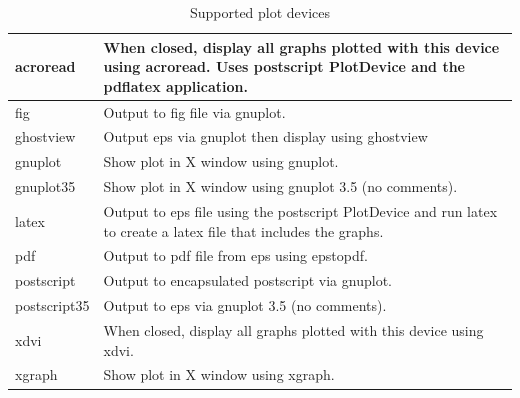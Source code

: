 \documentclass[11pt]{article}
\begin{document}
\begin{table}[ht]
\begin{center}
\begin{tabular}{|l|l|}\hline
  acroread     & \begin{minipage}[c]{4in}
                 \vspace{0.05in}
                 When closed, display all graphs plotted with this 
		 device using acroread.  Uses postscript PlotDevice and the 
                 pdflatex application.
                 \vspace{0.05in}
                 \end{minipage} \\\hline
  fig          & Output to fig file via gnuplot.  \\\hline
  ghostview    & Output eps via gnuplot then display using ghostview \\ \hline
  gnuplot      & Show plot in X window using gnuplot.    \\ \hline
  gnuplot35    & Show plot in X window using gnuplot 3.5 (no comments).
                  \\ \hline
  latex        & \begin{minipage}[c]{4in}
                 \vspace{0.05in}
                 Output to eps file using the postscript PlotDevice
                 and run latex to create a latex file that includes the 
                 graphs.
                 \vspace{0.05in}
                 \end{minipage}  \\ \hline
  pdf          & Output to pdf file from eps using epstopdf.  \\ \hline
  postscript   & Output to encapsulated postscript via gnuplot.  \\ \hline
  postscript35 & Output to eps via gnuplot 3.5 (no comments).  \\ \hline
  xdvi         & \begin{minipage}[c]{4in}
                 \vspace{0.05in}
                 When closed, display all graphs plotted with this
		 device using xdvi.
                 \vspace{0.05in}
                 \end{minipage} \\ \hline
  xgraph       & Show plot in X window using xgraph.  \\ \hline
\end{tabular}
\end{center}
\caption{Supported plot devices}\label{PlotDevicesTable}
\end{table}
\end{document}

